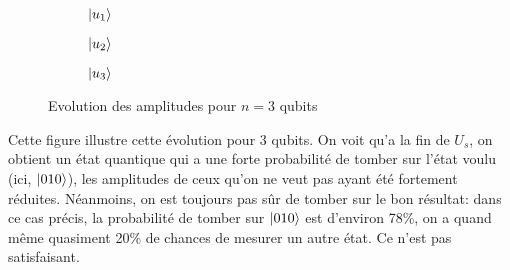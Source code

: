 \begin{figure*}[t!]
  \centering
  \begin{subfigure}[t]{0.33\textwidth}
      \centering
      \caption{$\ket{u_1}$}
  \end{subfigure}%
  \begin{subfigure}[t]{0.33\textwidth}
      \centering
      \caption{$\ket{u_2}$}
  \end{subfigure}
  \begin{subfigure}[t]{0.33\textwidth}
    \centering
    \caption{$\ket{u_3}$}
  \end{subfigure}
  \caption{Evolution des amplitudes pour $n=3$ qubits}
\end{figure*}

Cette figure illustre cette évolution pour 3 qubits. On voit qu'a la fin de $U_s$, on obtient un état quantique qui a une forte probabilité de tomber sur l'état voulu (ici, $\ket{010}$), les amplitudes de ceux qu'on ne veut pas ayant été fortement réduites. Néanmoins, on est toujours pas sûr de tomber sur le bon résultat: dans ce cas précis, la probabilité de tomber sur $\ket{010}$ est d'environ 78\%, on a quand même quasiment 20\% de chances de mesurer un autre état. Ce n'est pas satisfaisant.

